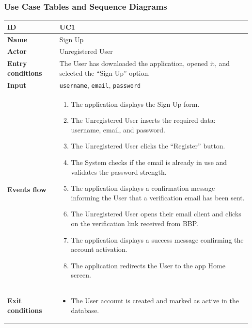 \subsubsection{Use Case Tables and Sequence Diagrams}

\begin{table}[H]
\centering
\begin{tabularx}{\textwidth}{|m{3.5cm}|X|}
\hline
\textbf{ID} & UC1 \\ \hline
\textbf{Name} & Sign Up \\ \hline
\textbf{Actor} & Unregistered User \\ \hline
\textbf{Entry conditions} & The User has downloaded the application, opened it, and selected the ``Sign Up'' option. \\ \hline
\textbf{Input} & \texttt{username}, \texttt{email}, \texttt{password} \\ \hline
\textbf{Events flow} & 
    \begin{enumerate}[nosep, leftmargin=*, before=\vspace{0.3em}, after=\vspace{0.3em}]
        \item The application displays the Sign Up form.
        \item The Unregistered User inserts the required data: username, email, and password.
        \item The Unregistered User clicks the ``Register'' button.
        \item The System checks if the email is already in use and validates the password strength.
        \item The application displays a confirmation message informing the User that a verification email has been sent.
        \item The Unregistered User opens their email client and clicks on the verification link received from BBP.
        \item The application displays a success message confirming the account activation.
        \item The application redirects the User to the app Home screen.
    \end{enumerate} 
    \\ \hline
\textbf{Exit conditions} & 
    \begin{itemize}[nosep, leftmargin=*, before=\vspace{0.3em}, after=\vspace{0.3em}]
        \item The User account is created and marked as active in the database.

\end{itemize}
\end{tabularx}
\end{table}
